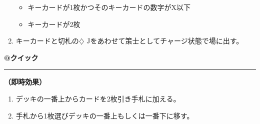 \documentclass[twocolumn,a5paper,papersize,10pt]{jarticle}
\begin{document}
\begin{tcolorbox}[title={\small\bf【Action】策士召喚}{\scriptsize （召喚）}]
\begin{enumerate}
\vspace{-1zh}%
\begin{itemize}
\setlength{\leftskip}{-0.3cm}
\setlength{\parskip}{0pt} %

\item キーカードが1枚かつそのキーカードの数字がX以下

\item キーカードが2枚
\vspace{-1zh}%
\end{itemize}
\item キーカードと切札の{\normalsize $\diamondsuit$} Jをあわせて策士としてチャージ状態で場に出す。
\vspace{-1zh}%
\end{enumerate}

\vspace{1mm} %
\end{tcolorbox}

\vspace{-1zh}
\begin{tcolorbox}[title={\small\bf【Action】先読み}{\scriptsize （兵士起因）}]

{\scriptsize\bf @クイック }

\vspace{1mm} %
\hrule height 0.1mm depth 0mm width 62mm %
\vspace{1mm} %

{\bf（即時効果）}


\vspace{-1zh}%
\begin{enumerate}
\setlength{\leftskip}{-0.3cm}
\setlength{\parskip}{0pt} %

\item デッキの一番上からカードを2枚引き手札に加える。

\item 手札から1枚選びデッキの一番上もしくは一番下に移す。
\vspace{-1zh}%
\end{enumerate}

\vspace{1mm} %
\end{tcolorbox}

\vspace{-1zh}
  
\end{document}
